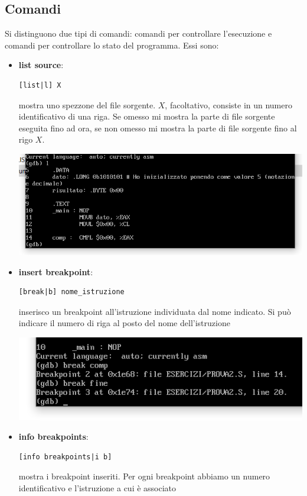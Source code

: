 \documentclass[11pt]{report}
\begin{document}
\subsection{Comandi}
Si distinguono due tipi di comandi: comandi per controllare l'esecuzione e comandi per controllare lo stato del programma. Essi sono:
\small
\begin{itemize}
\item \textbf{list source}:
\begin{verbatim}
[list|l] X
\end{verbatim}
mostra uno spezzone del file sorgente. $X$, facoltativo, consiste in un numero identificativo di una riga. Se omesso mi mostra la parte di file sorgente eseguita fino ad ora, se non omesso mi mostra la parte di file sorgente fino al rigo $X$.
\begin{center}
\includegraphics{img/69.PNG}
\end{center}
\item \textbf{insert breakpoint}:
\begin{verbatim}
[break|b] nome_istruzione
\end{verbatim}
inserisco un breakpoint all'istruzione individuata dal nome indicato. Si può indicare il numero di riga al posto del nome dell'istruzione
\begin{center}
\includegraphics{img/70.PNG}
\end{center}
\item \textbf{info breakpoints}:
\begin{verbatim}
[info breakpoints|i b]
\end{verbatim}
mostra i breakpoint inseriti. Per ogni breakpoint abbiamo un numero identificativo e l'istruzione a cui è associato

\end{itemize}
\end{document}
